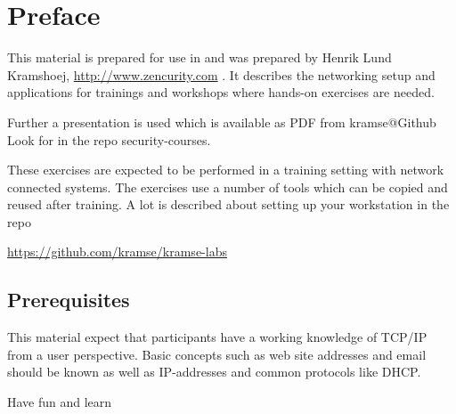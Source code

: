 \documentclass[a4paper,11pt,notitlepage]{report}
\begin{document}
\rm
{}

\newcommand{\emne}[1]{Communication and Network Security workshop}
\newcommand{\kursus}[1]{Communication and Network Security workshop}
\newcommand{\kursusnavn}[1]{Communication and Network Security workshop\\ exercises}




\setcounter{tocdepth}{0}

\normal

{\color{titlecolor}\tableofcontents}

\normal
\pagestyle{fancyplain}
\chapter*{\color{titlecolor}Preface}

This material is prepared for use in \emph{\kursus} and was prepared by
Henrik Lund Kramshoej, \url{http://www.zencurity.com} .
It describes the networking setup and
applications for trainings and workshops where hands-on exercises are needed.

\vskip 1cm
Further a presentation is used which is available as PDF from kramse@Github\\
Look for \jobname in the repo security-courses.

These exercises are expected to be performed in a training setting with network connected systems. The exercises use a number of tools which can be copied and reused after training. A lot is described about setting up your workstation in the repo

\url{https://github.com/kramse/kramse-labs}



\section*{\color{titlecolor}Prerequisites}

This material expect that participants have a working knowledge of
TCP/IP from a user perspective. Basic concepts such as web site addresses and email should be known as well as IP-addresses and common protocols like DHCP.

\vskip 1cm
Have fun and learn
\eject

\rhead{\fancyplain{}{\bf \chaptername\ \thechapter}}
\end{document}
